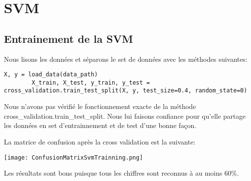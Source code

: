 
\chapter{SVM} %

\label{Chapitre 4.1} %

\lhead{ \emph{}} %

\section{Entrainement de la SVM}

Nous lisons les données et séparons le set de données avec les méthodes suivantes:
\begin{lstlisting}[frame=single,style=Python]
X, y = load_data(data_path)
        X_train, X_test, y_train, y_test = cross_validation.train_test_split(X, y, test_size=0.4, random_state=0)
\end{lstlisting}

Nous n'avons pas vérifié le fonctionnement exacte de la méthode cross_validation.train_test_split. Nous lui faisons confiance pour qu'elle partage les données en set d'entrainnement et de test d'une bonne façon.

La matrice de confusion après la cross validation est la suivante:
\begin{center} 
\hspace{12.45cm}
\texttt{[image: ConfusionMatrixSvmTrainning.png]}
\end{center}

Les résultats sont bons puisque tous les chiffres sont reconnus à au moins 60\%.


